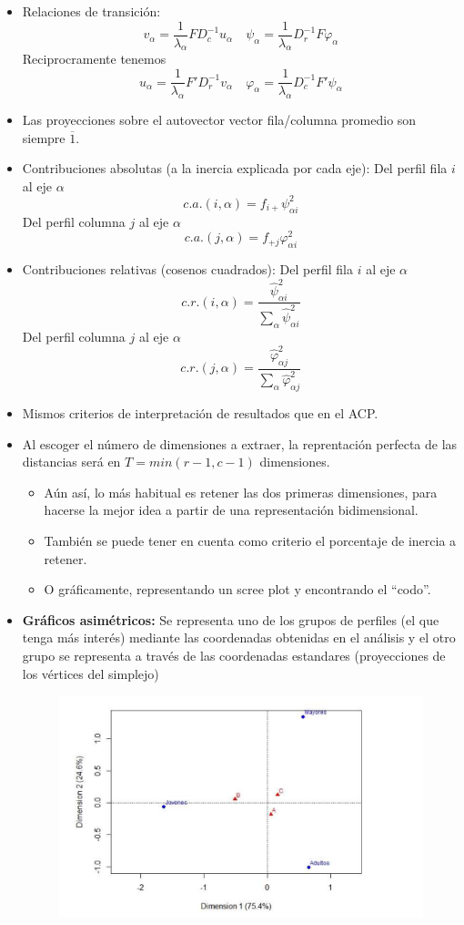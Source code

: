 \begin{itemize}
\begin{itemize}
          \end{itemize}
    \item Relaciones de transición: \[v_\alpha=\frac{1}{\lambda_\alpha}FD_c^{-1}u_\alpha \quad \psi_\alpha=\frac{1}{\lambda_\alpha}D_r^{-1}F\varphi_\alpha\] Reciprocramente tenemos \[u_\alpha=\frac{1}{\lambda_\alpha}F'D_r^{-1}v_\alpha \quad \varphi_\alpha=\frac{1}{\lambda_\alpha}D_c^{-1}F'\psi_\alpha\]
    \item Las proyecciones sobre el autovector vector fila/columna promedio son siempre $\overline{1}$.
    \item Contribuciones absolutas (a la inercia explicada por cada eje): Del perfil fila $i$ al eje $\alpha$ \[c.a.(i,\alpha)=f_{i+}\psi^2_{\alpha i}\] Del perfil columna $j$ al eje $\alpha$ \[c.a.(j,\alpha)=f_{+j}\varphi^2_{\alpha i}\]
    \item Contribuciones relativas (cosenos cuadrados): Del perfil fila $i$ al eje $\alpha$ \[c.r.(i,\alpha)=\frac{\hat{\psi}^2_{\alpha i}}{\sum_{\alpha}\hat{\psi}^2_{\alpha i}}\] Del perfil columna $j$ al eje $\alpha$ \[c.r.(j,\alpha)=\frac{\hat{\varphi}^2_{\alpha j}}{\sum_{\alpha}\hat{\varphi}^2_{\alpha j}}\]
    \item Mismos criterios de interpretación de resultados que en el ACP.
    \item Al escoger el número de dimensiones a extraer, la reprentación perfecta de las distancias será en $T=min(r-1, c-1)$ dimensiones.
    \begin{itemize}
        \item Aún así, lo más habitual es retener las dos primeras dimensiones, para hacerse la mejor idea a partir de una representación bidimensional.
        \item También se puede tener en cuenta como criterio el porcentaje de inercia a retener.
        \item O gráficamente, representando un scree plot y encontrando el ``codo''.
    \end{itemize}
    \item \textbf{Gráficos asimétricos:} Se representa uno de los grupos de perfiles (el que tenga más interés) mediante las coordenadas obtenidas en el análisis y el otro grupo se representa a través de las coordenadas estandares (proyecciones de los vértices del simplejo)
    \begin{figure}[ht]
        \includegraphics[width=\textwidth]{assets/grafico_asimetrico.png}

\end{figure}
\end{itemize}
